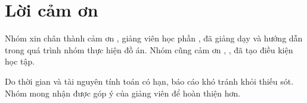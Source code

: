\chapter*{Lời cảm ơn}

Nhóm xin chân thành cảm ơn \GVHD{}, giảng viên học phần \TenMonHoc{}, đã giảng dạy và hướng dẫn trong quá trình
nhóm thực hiện đồ án. Nhóm cũng cảm ơn \TenKhoa{}, \TenTruong{}, đã tạo điều kiện học tập.

Do thời gian và tài nguyên tính toán có hạn, báo cáo khó tránh khỏi thiếu sót. Nhóm mong nhận được góp ý của giảng
viên để hoàn thiện hơn.

\vspace{1cm}
\begin{flushright}
  \textit{\ThoiGian}\\
  \textbf{\TenNhom}
\end{flushright}

